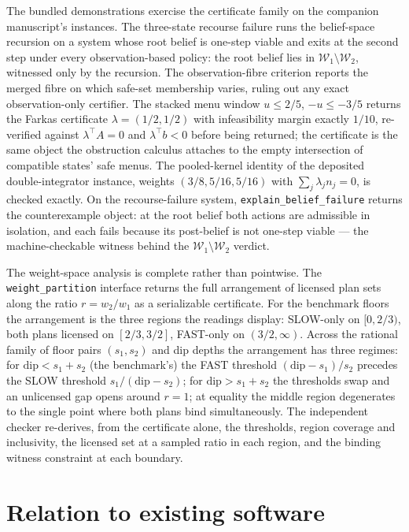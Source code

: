 \documentclass[3p,11pt]{elsarticle}
\begin{document}
The bundled demonstrations exercise the certificate family on the companion
manuscript's instances. The three-state recourse failure runs the
belief-space recursion on a system whose root belief is one-step viable and
exits at the second step under every observation-based policy: the root
belief lies in $\mathcal{W}_1 \setminus \mathcal{W}_2$, witnessed only by
the recursion. The observation-fibre criterion reports the merged fibre on
which safe-set membership varies, ruling out any exact observation-only
certifier. The stacked menu window $u \leq 2/5$, $-u \leq -3/5$ returns the
Farkas certificate $\lambda = (1/2, 1/2)$ with infeasibility margin exactly
$1/10$, re-verified against $\lambda^{\top} A = 0$ and
$\lambda^{\top} b < 0$ before being returned; the certificate is the same
object the obstruction calculus attaches to the empty intersection of
compatible states' safe menus. The pooled-kernel identity of the deposited
double-integrator instance, weights $(3/8, 5/16, 5/16)$ with
$\sum_j \lambda_j n_j = 0$, is checked exactly. On the recourse-failure
system, \texttt{explain\_belief\_failure} returns the counterexample
object: at the root belief both actions are admissible in isolation, and
each fails because its post-belief is not one-step viable --- the
machine-checkable witness behind the
$\mathcal{W}_1 \setminus \mathcal{W}_2$ verdict.

The weight-space analysis is complete rather than pointwise. The
\texttt{weight\_partition} interface returns the full arrangement of
licensed plan sets along the ratio $r = w_2/w_1$ as a serializable
certificate. For the benchmark floors the arrangement is the three regions
the readings display: SLOW-only on $[0, 2/3)$, both plans licensed on
$[2/3, 3/2]$, FAST-only on $(3/2, \infty)$. Across the rational family of
floor pairs $(s_1, s_2)$ and dip depths the arrangement has three regimes:
for $\mathrm{dip} < s_1 + s_2$ (the benchmark's) the FAST threshold
$(\mathrm{dip} - s_1)/s_2$ precedes the SLOW threshold
$s_1/(\mathrm{dip} - s_2)$; for $\mathrm{dip} > s_1 + s_2$ the thresholds
swap and an unlicensed gap opens around $r = 1$; at equality the middle
region degenerates to the single point where both plans bind
simultaneously. The independent checker re-derives, from the certificate
alone, the thresholds, region coverage and inclusivity, the licensed set at
a sampled ratio in each region, and the binding witness constraint at each
boundary.

\section{Relation to existing software}\label{sec:related}
\end{document}
